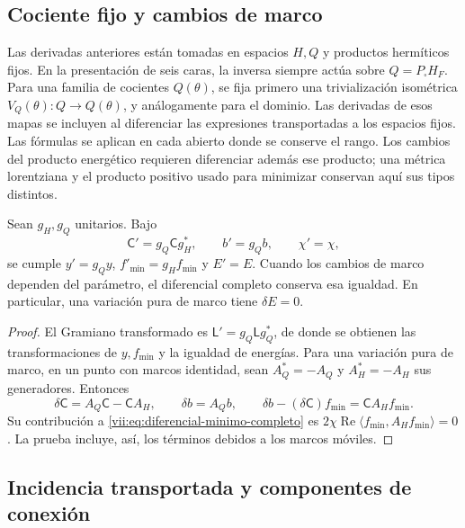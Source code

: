 \subsection{Cociente fijo y cambios de marco}
\label{vii:subsec:marcos-minimo}

Las derivadas anteriores están tomadas en espacios \(H,Q\) y productos
hermíticos fijos. En la presentación de seis caras, la inversa siempre
actúa sobre \(Q=P_\square H_F\). Para una familia de cocientes
\(Q(\theta)\), se fija primero una trivialización isométrica
\(V_Q(\theta):Q\to Q(\theta)\), y análogamente para el dominio.
Las derivadas de esos mapas se incluyen al diferenciar las expresiones
transportadas a los espacios fijos. Las fórmulas se aplican en cada
abierto donde se conserve el rango. Los cambios del producto energético
requieren diferenciar además ese producto; una métrica lorentziana
y el producto positivo usado para minimizar conservan aquí sus tipos
distintos.

\begin{proposition}
\label{vii:prop:covariancia-minimo}
Sean \(g_H,g_Q\) unitarios. Bajo
\[
 \mathsf C'=g_Q\mathsf C g_H^*,\qquad b'=g_Qb,\qquad \chi'=\chi,
\]
se cumple \(y'=g_Qy\), \(f'_{\min}=g_Hf_{\min}\) y \(E'=E\).
Cuando los cambios de marco dependen del parámetro, el diferencial
completo conserva esa igualdad. En particular, una variación pura de
marco tiene \(\delta E=0\).
\end{proposition}

\begin{proof}
El Gramiano transformado es \(\mathsf L'=g_Q\mathsf Lg_Q^*\),
de donde se obtienen las transformaciones de \(y,f_{\min}\) y
la igualdad de energías. Para una variación pura de marco, en un punto
con marcos identidad, sean \(A_Q^*=-A_Q\) y \(A_H^*=-A_H\)
sus generadores. Entonces
\[
 \delta\mathsf C=A_Q\mathsf C-\mathsf C A_H,\qquad
 \delta b=A_Qb,\qquad
 \delta b-(\delta\mathsf C)f_{\min}=\mathsf C A_Hf_{\min}.
\]
Su contribución a \eqref{vii:eq:diferencial-minimo-completo} es
\(2\chi\operatorname{Re}\langle f_{\min},A_Hf_{\min}\rangle=0\).
La prueba incluye, así, los términos debidos a los marcos móviles.
\end{proof}

\subsection{Incidencia transportada y componentes de conexión}
\label{vii:subsec:incidencia-conexion-minima}

